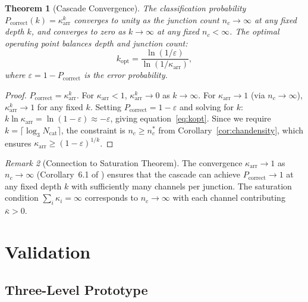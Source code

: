\documentclass[11pt,twocolumn,a4paper]{article}
\newtheorem{theorem}{Theorem}[section]
\theoremstyle{remark}
\newtheorem{remark}[theorem]{Remark}
\newcommand{\kap}{\kappa}
\begin{document}
\begin{theorem}[Cascade Convergence]
\label{thm:convergence}
The classification probability $P_{\mathrm{correct}}(k) = \kap_{\mathrm{arr}}^k$
converges to unity as the junction count $n_c \to \infty$ at any fixed depth
$k$, and converges to zero as $k \to \infty$ at any fixed $n_c < \infty$.
The optimal operating point balances depth and junction count:
\begin{equation}
k_{\mathrm{opt}} = \frac{\ln(1/\varepsilon)}{\ln(1/\kap_{\mathrm{arr}})},
\label{eq:kopt}
\end{equation}
where $\varepsilon = 1 - P_{\mathrm{correct}}$ is the error probability.
\end{theorem}

\begin{proof}
$P_{\mathrm{correct}} = \kap_{\mathrm{arr}}^k$. For $\kap_{\mathrm{arr}} < 1$,
$\kap_{\mathrm{arr}}^k \to 0$ as $k \to \infty$. For $\kap_{\mathrm{arr}} \to 1$
(via $n_c \to \infty$), $\kap_{\mathrm{arr}}^k \to 1$ for any fixed $k$.
Setting $P_{\mathrm{correct}} = 1 - \varepsilon$ and solving for $k$:
$k \ln \kap_{\mathrm{arr}} = \ln(1-\varepsilon) \approx -\varepsilon$, giving
equation~\eqref{eq:kopt}. Since we require $k = \lceil\log_3 N_{\mathrm{cat}}\rceil$,
the constraint is $n_c \geq n_c^*$ from Corollary~\ref{cor:chandensity},
which ensures $\kap_{\mathrm{arr}} \geq (1-\varepsilon)^{1/k}$.
\end{proof}

\begin{remark}[Connection to Saturation Theorem]
The convergence $\kap_{\mathrm{arr}} \to 1$ as $n_c \to \infty$
(Corollary~6.1 of \citep{companion3}) ensures that the cascade can achieve
$P_{\mathrm{correct}} \to 1$ at any fixed depth $k$ with sufficiently many
channels per junction. The saturation condition $\sum_i \kap_i = \infty$
corresponds to $n_c \to \infty$ with each channel contributing $\bar{\kap} > 0$.
\end{remark}

\section{Validation}
\label{sec:validation}

\subsection{Three-Level Prototype}
\end{document}
